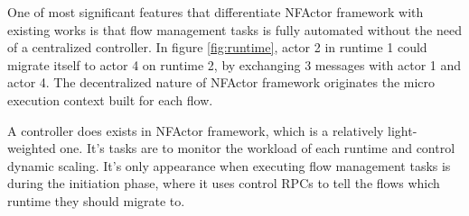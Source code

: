 One of most significant features that differentiate NFActor framework with existing works \cite{gember2015opennf} is that flow management tasks is fully automated without the need of a centralized controller. In figure \ref{fig:runtime}, actor 2 in runtime 1 could migrate itself to actor 4 on runtime 2, by exchanging 3 messages with actor 1 and actor 4. The decentralized nature of NFActor framework originates the micro execution context built for each flow.

A controller does exists in NFActor framework, which is a relatively light-weighted one. It's tasks are to monitor the workload of each runtime and control dynamic scaling. It's only appearance when executing flow management tasks is during the initiation phase, where it uses control RPCs to tell the flows which runtime they should migrate to.
